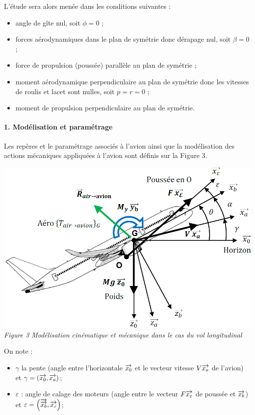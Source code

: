 \begin{multicols}{2}
L’étude sera alors menée dans les conditions suivantes :
\begin{itemize}
\item angle de gîte nul, soit $\phi=0$ ;
\item forces aérodynamiques dans le plan de symétrie donc dérapage nul, soit $\beta=0$ ;
\item force de propulsion (poussée) parallèle au plan de symétrie ;
\item moment aérodynamique perpendiculaire au plan de symétrie donc les vitesses de roulis et lacet sont nulles, soit $p=r=0$ ;
\item moment de propulsion perpendiculaire au plan de symétrie.
\end{itemize}

\paragraph*{1. Modélisation et paramétrage}

Les repères et le paramétrage associés à l’avion ainsi que la modélisation des actions mécaniques
appliquées à l’avion sont définis sur la Figure 3.

\begin{center}
\includegraphics[width=\linewidth]{images/fig_03}
\textit{Figure 3 Modélisation cinématique et mécanique dans le cas du vol longitudinal}
\end{center}
 On note : 
 \begin{itemize}
\item $\gamma$ la pente (angle entre l'horizontale $\overrightarrow{x_0}$ et le vecteur vitesse $V\overrightarrow{x_a}$ de l'avion) et $\gamma = \left(\overrightarrow{{x_0}},\overrightarrow{x_a}\right)$;

\item $\varepsilon$ : angle de calage des moteurs (angle entre le vecteur $F\overrightarrow{x_\varepsilon}$ de poussée et $\overrightarrow{x_b}$) et $\varepsilon =\left(\overrightarrow{\overrightarrow{x_b}},\overrightarrow{x_\varepsilon}\right)$;


\end{itemize}
\end{multicols}
